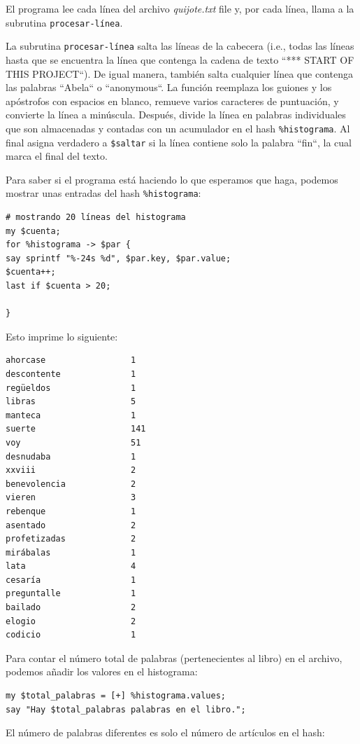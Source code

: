 %

El programa lee cada línea del archivo \emph{quijote.txt} file y,
por cada línea, llama a la subrutina \verb|procesar-línea|.

La subrutina \verb|procesar-línea| salta las líneas de la cabecera
(i.e., todas las líneas hasta que se encuentra la línea que contenga
la cadena de texto ``*** START OF THIS PROJECT``). De igual manera,
también salta cualquier línea que contenga las palabras ``Abela`` o
``anonymous``. La función reemplaza 
los guiones y los apóstrofos con espacios en blanco, remueve varios 
caracteres de puntuación, y convierte la línea a minúscula. Después,
divide la línea en palabras individuales que son almacenadas y 
contadas con un acumulador en el hash \verb|%histograma|.  Al final
asigna verdadero a \verb|$saltar| si la línea contiene solo la 
palabra ``fin``, la cual marca el final del texto.

Para saber si el programa está haciendo lo que esperamos que haga,
podemos mostrar unas entradas del hash \verb|%histograma|:

\begin{verbatim}
# mostrando 20 líneas del histograma
my $cuenta;
for %histograma -> $par {
say sprintf "%-24s %d", $par.key, $par.value;
$cuenta++;
last if $cuenta > 20;

}
\end{verbatim}

Esto imprime lo siguiente:

\begin{verbatim}
ahorcase                 1
descontente              1
regüeldos                1
libras                   5
manteca                  1
suerte                   141
voy                      51
desnudaba                1
xxviii                   2
benevolencia             2
vieren                   3
rebenque                 1
asentado                 2
profetizadas             2
mirábalas                1
lata                     4
cesaría                  1
preguntalle              1
bailado                  2
elogio                   2
codicio                  1
\end{verbatim}

Para contar el número total de palabras (pertenecientes al libro) en el archivo,
podemos añadir los valores en el histograma:

\begin{verbatim}
my $total_palabras = [+] %histograma.values;
say "Hay $total_palabras palabras en el libro.";
\end{verbatim}
%
El número de palabras diferentes es solo el número de artículos en
el hash:

